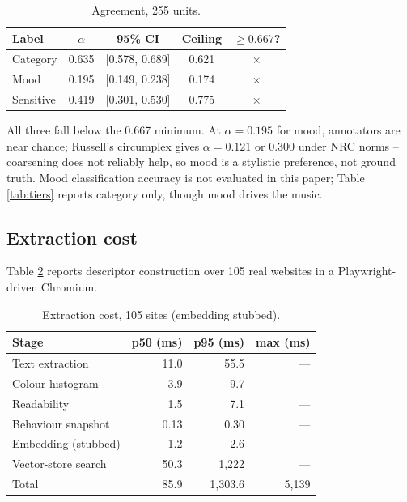 \documentclass[conference]{IEEEtran}
\let\IEEEoriginalcaption\caption
\renewcommand{\caption}[1]{\IEEEoriginalcaption{\footnotesize #1}}
\newcommand{\no}{$\times$}
\begin{document}
\begin{table}[t]
\caption{Agreement, 255 units.}
\label{tab:agreement}
\begin{center}
\scriptsize
\begin{tabular}{lcccc}
\toprule
\textbf{Label} & \textbf{$\alpha$} & \textbf{95\% CI} & \textbf{Ceiling} & \textbf{$\geq 0.667$?} \\
\midrule
Category  & 0.635 & [0.578, 0.689] & 0.621 & \no \\
Mood      & 0.195 & [0.149, 0.238] & 0.174 & \no \\
Sensitive & 0.419 & [0.301, 0.530] & 0.775 & \no \\
\bottomrule
\end{tabular}
\end{center}
\end{table}

All three fall below the 0.667 minimum. At $\alpha=0.195$ for mood,
annotators are near chance; Russell's circumplex \cite{russell} gives
$\alpha=0.121$ or $0.300$ under NRC norms \cite{nrcvad} -- coarsening does
not reliably help, so mood is a stylistic preference, not ground truth.
Mood classification accuracy is not evaluated in this paper; Table
\ref{tab:tiers} reports category only, though mood drives the music.

\subsection{Extraction cost}
\label{sec:res-extraction}

Table \ref{tab:extraction} reports descriptor construction over 105 real
websites in a Playwright-driven Chromium.

\begin{table}[t]
\caption{Extraction cost, 105 sites (embedding stubbed).}
\label{tab:extraction}
\begin{center}
\scriptsize
\begin{tabular}{lrrr}
\toprule
\textbf{Stage} & \textbf{p50 (ms)} & \textbf{p95 (ms)} & \textbf{max (ms)} \\
\midrule
Text extraction & 11.0 & 55.5 & --- \\
Colour histogram & 3.9 & 9.7 & --- \\
Readability & 1.5 & 7.1 & --- \\
Behaviour snapshot & 0.13 & 0.30 & --- \\
Embedding (stubbed) & 1.2 & 2.6 & --- \\
Vector-store search & 50.3 & 1{,}222 & --- \\
\midrule
Total & 85.9 & 1{,}303.6 & 5{,}139 \\
\bottomrule
\end{tabular}
\end{center}
\end{table}
\end{document}

